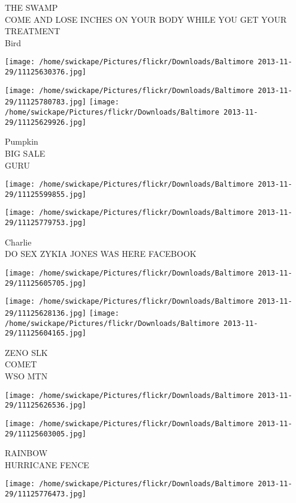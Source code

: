 \documentclass[10pt,letterpaper]{article}
\begin{document}
THE SWAMP\\
COME AND LOSE INCHES ON YOUR BODY WHILE YOU GET YOUR TREATMENT\\
Bird
\pagebreak

\texttt{[image: /home/swickape/Pictures/flickr/Downloads/Baltimore 2013-11-29/11125630376.jpg]}

\vspace{0.25in}
\texttt{[image: /home/swickape/Pictures/flickr/Downloads/Baltimore 2013-11-29/11125780783.jpg]}
\texttt{[image: /home/swickape/Pictures/flickr/Downloads/Baltimore 2013-11-29/11125629926.jpg]}

Pumpkin\\
BIG SALE\\
GURU
\pagebreak

\texttt{[image: /home/swickape/Pictures/flickr/Downloads/Baltimore 2013-11-29/11125599855.jpg]}

\vspace{0.25in}
\texttt{[image: /home/swickape/Pictures/flickr/Downloads/Baltimore 2013-11-29/11125779753.jpg]}

Charlie\\
DO SEX ZYKIA JONES WAS HERE FACEBOOK
\pagebreak

\texttt{[image: /home/swickape/Pictures/flickr/Downloads/Baltimore 2013-11-29/11125605705.jpg]}

\vspace{0.25in}
\texttt{[image: /home/swickape/Pictures/flickr/Downloads/Baltimore 2013-11-29/11125628136.jpg]}
\texttt{[image: /home/swickape/Pictures/flickr/Downloads/Baltimore 2013-11-29/11125604165.jpg]}

ZENO SLK\\
COMET\\
WSO MTN
\pagebreak

\texttt{[image: /home/swickape/Pictures/flickr/Downloads/Baltimore 2013-11-29/11125626536.jpg]}

\vspace{0.25in}
\texttt{[image: /home/swickape/Pictures/flickr/Downloads/Baltimore 2013-11-29/11125603005.jpg]}

RAINBOW\\
HURRICANE FENCE
\pagebreak

\texttt{[image: /home/swickape/Pictures/flickr/Downloads/Baltimore 2013-11-29/11125776473.jpg]}
\end{document}
